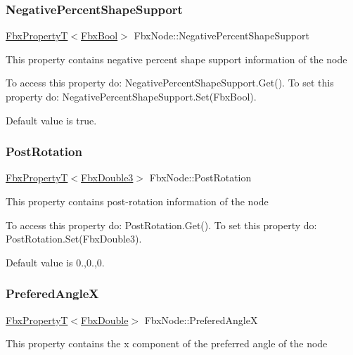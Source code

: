\subsubsection{\texorpdfstring{Negative\+Percent\+Shape\+Support}{NegativePercentShapeSupport}}
{\footnotesize\ttfamily \hyperlink{class_fbx_property_t}{Fbx\+PropertyT}$<$\hyperlink{fbxtypes_8h_a92e0562b2fe33e76a242f498b362262e}{Fbx\+Bool}$>$ Fbx\+Node\+::\+Negative\+Percent\+Shape\+Support}

This property contains negative percent shape support information of the node

To access this property do\+: Negative\+Percent\+Shape\+Support.\+Get(). To set this property do\+: Negative\+Percent\+Shape\+Support.\+Set(\+Fbx\+Bool).

Default value is true. \mbox{\label{class_fbx_node_a79bbc002a7cdb919db11525831a6a469}} 
\subsubsection{\texorpdfstring{Post\+Rotation}{PostRotation}}
{\footnotesize\ttfamily \hyperlink{class_fbx_property_t}{Fbx\+PropertyT}$<$\hyperlink{fbxtypes_8h_ae0a96f14cde566774c7553aa7523b7a7}{Fbx\+Double3}$>$ Fbx\+Node\+::\+Post\+Rotation}

This property contains post-\/rotation information of the node

To access this property do\+: Post\+Rotation.\+Get(). To set this property do\+: Post\+Rotation.\+Set(\+Fbx\+Double3).

Default value is 0.,0.,0. \mbox{\label{class_fbx_node_a1d8741e42e815896c90d9305d34419f9}} 
\subsubsection{\texorpdfstring{Prefered\+AngleX}{PreferedAngleX}}
{\footnotesize\ttfamily \hyperlink{class_fbx_property_t}{Fbx\+PropertyT}$<$\hyperlink{fbxtypes_8h_a171e72a1c46fc15c1a6c9c31948c1c5b}{Fbx\+Double}$>$ Fbx\+Node\+::\+Prefered\+AngleX}

This property contains the x component of the preferred angle of the node

